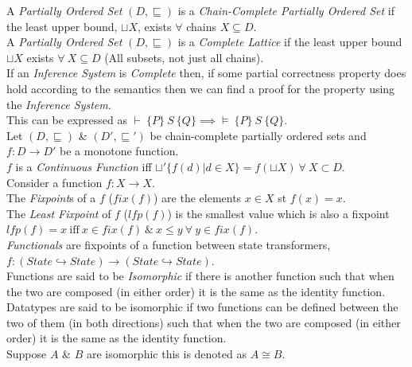 \documentclass[11pt,a4paper]{article}
\begin{document}
A \textit{Partially Ordered Set} $(D,\sqsubseteq)$ is a \textit{Chain-Complete Partially Ordered Set} if the least upper bound, $\sqcup X$, exists $\forall$ chains $X\subseteq D$.\\

A \textit{Partially Ordered Set} $(D,\sqsubseteq)$ is a \textit{Complete Lattice} if the least upper bound $\sqcup X$ exists $\forall\ X\subseteq D$ (\ie All subsets, not just all chains).\\

If an \textit{Inference System} is \textit{Complete} then, if some partial correctness property does hold according to the semantics then we can find a proof for the property using the \textit{Inference System}.\\
\NB This can be expressed as $\vdash\ \{P\}\ S\ \{Q\}\implies\vDash\ \{P\}\ S\ \{Q\}$.\\

Let $(D,\sqsubseteq)$ \& $(D',\sqsubseteq')$ be chain-complete partially ordered sets and $f:D\to D'$ be a monotone function.\\
$f$ is a \textit{Continuous Function} iff $\sqcup'\{f(d)|d\in X\}=f(\sqcup X)\ \forall\ X\subset D$.\\

Consider a function $f:X\to X$.\\
The \textit{Fixpoint}s of a $f$ ($fix(f)$) are the elements $x\in X$ st $f(x)=x$.\\
The \textit{Least Fixpoint} of $f$ ($lfp(f)$) is the smallest value which is also a fixpoint\\
\ie $lfp(f)=x\ \mathrm{iff}\ x\in fix(f)\  \&\ x\leq y\ \forall\ y\in fix(f)$.\\

\textit{Functionals} are fixpoints of a function between state transformers, $f:(State\hookrightarrow State)\to(State\hookrightarrow State)$.\\

Functions are said to be \textit{Isomorphic} if there is another function such that when the two are composed (in either order) it is the same as the identity function.\\
Datatypes are said to be isomorphic if two functions can be defined between the two of them (in both directions) such that when the two are composed (in either order) it is the same as the identity function.\\
\NB Suppose $A$ \& $B$ are isomorphic this is denoted as $A\cong B$.\\
\end{document}
